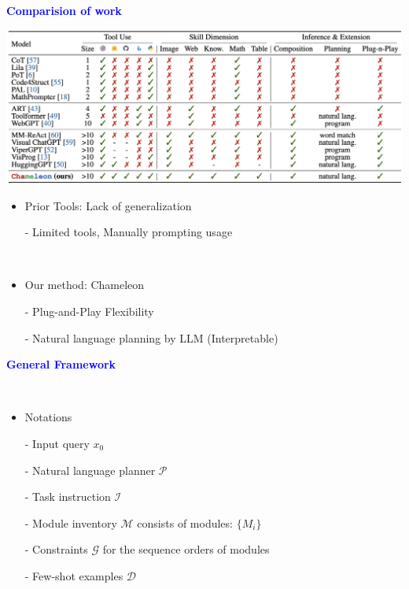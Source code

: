 \documentclass[professionalfont]{beamer}
\begin{document}
\begin{frame}

\begin{center}
    { \textbf{\textcolor{blue}{ {\fontsize{12}{14}\selectfont Comparision of work} }} }
\end{center}

\begin{center}
    \includegraphics[width=1.0\textwidth]{table/1.png}
\end{center}

\begin{itemize}
    \item Prior Tools: Lack of generalization

    - Limited tools, Manually prompting usage

    \\[0.2cm]

    \item Our method: Chameleon

    - Plug-and-Play Flexibility

    - Natural language planning by LLM (Interpretable)

\end{itemize}

\end{frame}

\begin{frame}

\begin{center}
    { \textbf{\textcolor{blue}{ {\fontsize{12}{14}\selectfont General Framework} }} }
\end{center}
\\[0.3cm]

\begin{itemize}
    \item Notations

    - Input query \( x_0 \)

    - Natural language planner \( \mathcal{P} \)

    - Task instruction \( \mathcal{I} \)

    - Module inventory \( \mathcal{M} \) consists of modules: \( \{ M_i \} \)

    - Constraints \( \mathcal{G} \) for the sequence orders of modules

    - Few-shot examples \( \mathcal{D} \)
\end{itemize}

\end{frame}
\end{document}
